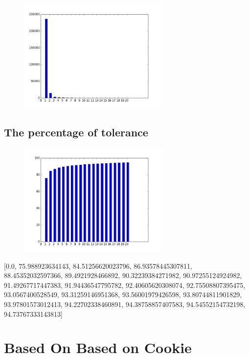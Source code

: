 \documentclass[10pt, conference, compsocconf]{IEEEtran}
\begin{document}
\begin{figure}[H]\centering\includegraphics[width=75mm,scale=0.5]{BasedonClientIDnumberofusersfingerprint}\end{figure}\subsection{The percentage of tolerance}
\begin{figure}[H]\centering\includegraphics[width=75mm,scale=0.5]{BasedonClientIDtolerance}\end{figure}[0.0, 75.988923634143, 84.51256620023796, 86.93578445307811, 88.45352032597366, 89.4921928466892, 90.32239384271982, 90.97255124924982, 91.49267717447383, 91.94436547795782, 92.40605620308074, 92.75508807395475, 93.0567400528549, 93.31259146951368, 93.56001979426598, 93.80744811901829, 93.97801573012413, 94.22702338460891, 94.38758857407583, 94.54552154732198, 94.73767333143813]\section{Based On Based on Cookie}
\end{document}
